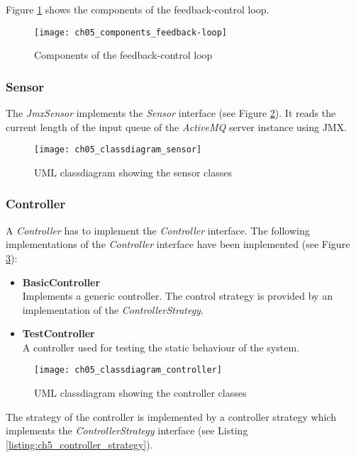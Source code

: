Figure \ref{fig:ch05_components_feedback_loop} shows the components of the feedback-control loop.

\begin{figure}[htbp]
	\centering
	\texttt{[image: ch05\_components\_feedback-loop]}
	\caption{Components of the feedback-control loop}
	\label{fig:ch05_components_feedback_loop}
\end{figure}

\subsubsection{Sensor}

The \emph{JmxSensor} implements the \emph{Sensor} interface (see Figure \ref{fig:ch05_classdiagram_sensor}). It reads the current length of the input queue of the \emph{ActiveMQ} server instance using \ac{JMX}.

\begin{figure}[htbp]
	\centering
	\texttt{[image: ch05\_classdiagram\_sensor]}
	\caption{\ac{UML} classdiagram showing the sensor classes}
	\label{fig:ch05_classdiagram_sensor}
\end{figure}

\subsubsection{Controller}
\label{sec:ch05_controller}
A \emph{Controller} has to implement the \emph{Controller} interface. The following implementations of the \emph{Controller} interface have been implemented (see Figure \ref{fig:ch05_classdiagram_controller}):
\begin{itemize}
	\item \textbf{BasicController}\\
	Implements a generic controller. The control strategy is provided by an implementation of the \emph{ControllerStrategy}.
	\item \textbf{TestController}\\
	A controller used for testing the static behaviour of the system.
\end{itemize}

\begin{figure}[htbp]
	\centering
	\texttt{[image: ch05\_classdiagram\_controller]}
	\caption{\ac{UML} classdiagram showing the controller classes}
	\label{fig:ch05_classdiagram_controller}
\end{figure}

The strategy of the controller is implemented by a controller strategy which implements the \emph{ControllerStrategy} interface (see Listing \ref{listing:ch5_controller_strategy}).

